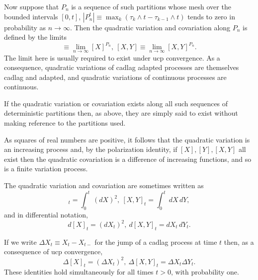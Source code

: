 \documentclass[12pt]{article}
\begin{document}
Now suppose that $P_n$ is a sequence of such partitions whose mesh over the bounded intervals $[0,t]$, $|P_n^t|\equiv\max_k(\tau_k\wedge t-\tau_{k-1}\wedge t)$ tends to zero in probability as $n\rightarrow\infty$. Then the quadratic variation and covariation along $P_n$ is defined by the limits
\begin{equation*}
[X]\equiv \lim_{n\rightarrow\infty}[X]^{P_n},\ [X,Y]\equiv\lim_{n\rightarrow\infty}[X,Y]^{P_n}.
\end{equation*}
The limit here is usually required to exist under ucp convergence. As a consequence, quadratic variations of cadlag adapted processes are themselves cadlag and adapted, and quadratic variations of continuous processes are continuous.

If the quadratic variation or covariation exists along all such sequences of deterministic partitions then, as above, they are simply said to exist without making reference to the partitions used.

As squares of real numbers are positive, it follows that the quadratic variation is an increasing process and, by the polarization identity, if $[X],[Y],[X,Y]$ all exist then the quadratic covariation is a difference of increasing functions, and so is a finite variation process.

The quadratic variation and covariation are sometimes written as
\begin{equation*}
[X]_t=\int_0^t\,(dX)^2,\ [X,Y]_t=\int_0^t\,dX\,dY,
\end{equation*}
and in differential notation,
\begin{equation*}
d[X]_t=(dX_t)^2,\ d[X,Y]_t=dX_t\,dY_t.
\end{equation*}

If we write $\Delta X_t\equiv X_t-X_{t-}$ for the jump of a cadlag process at time $t$ then, as a consequence of ucp convergence,
\begin{equation*}
\Delta [X]_t=(\Delta X_t)^2,\ \Delta [X,Y]_t=\Delta X_t \Delta Y_t.
\end{equation*}
These identities hold simultaneously for all times $t>0$, with probability one.


\end{document}
